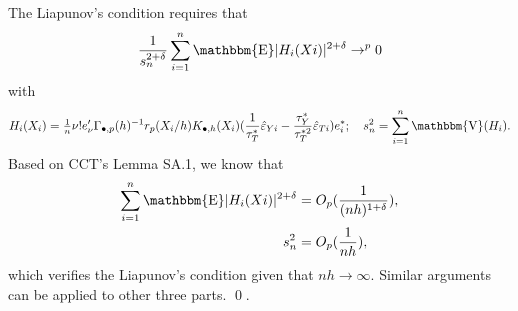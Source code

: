 \documentclass[12pt,]{article}
\DeclareMathOperator{\1}{\mathbbm{1}}
\DeclareMathOperator{\E}{\mathbbm{E}}
\DeclareMathOperator{\V}{\mathbbm{V}}
\begin{document}
The Liapunov's condition requires that
\begin{equation*}
\frac{1}{s_n^{2 + \delta}} \sum_{i=1}^{n} \E \lvert H_i(Xi) \rvert^{2 + \delta} \to^p 0
\end{equation*}
with
\begin{equation*}
H_i(X_i) = \tfrac{1}{n} \nu! e_\nu' \Gamma_{\bullet,p}(h)^{-1} r_p(X_i/h) K_{\bullet,h}(X_i) (\frac{1}{\tau_T^*} \hat \varepsilon_{Yi} - \frac{\tau_Y^*}{\tau_T^{*2}} \hat \varepsilon_{Ti}) e_i^*; \quad
s_n^2 = \sum_{i=1}^{n} \V (H_i).
\end{equation*}
Based on CCT's Lemma SA.1, we know that
\begin{align*}
\sum_{i=1}^{n} \E \lvert H_i(Xi) \rvert^{2 + \delta} & = O_p(\frac{1}{(nh)^{1 + \delta}}),  \\
s_n^2 & = O_p(\frac{1}{nh}),
\end{align*}
which verifies the Liapunov's condition given that $nh \to \infty$. Similar arguments can be applied to other three parts.
\qed.






\end{document}
